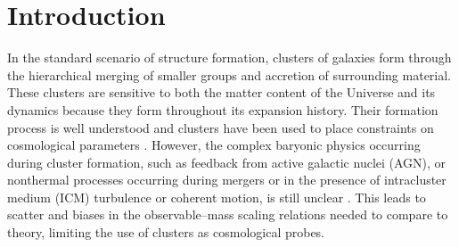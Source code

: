 \documentclass[traditabstract]{aa}
\begin{document}
\maketitle

\section{Introduction}\label{sec:Introduction}
In the standard scenario of structure formation, clusters of galaxies form through the hierarchical merging of smaller groups and  accretion of surrounding material. These clusters are sensitive to both the matter content of the Universe and its dynamics because they form throughout its expansion history. Their formation process is  well understood and clusters have been used to place constraints on cosmological parameters \citep[e.g.,][]{planck2013cluster_count}. However, the complex baryonic physics occurring during cluster formation, such as feedback from active galactic nuclei (AGN), or nonthermal processes occurring during mergers or in the presence of intracluster medium (ICM) turbulence or coherent motion, is still unclear \citep[see for example][]{borgani2011}. This leads to scatter and biases in the observable--mass scaling relations needed to compare to theory, limiting the use of clusters as cosmological probes.
\end{document}
